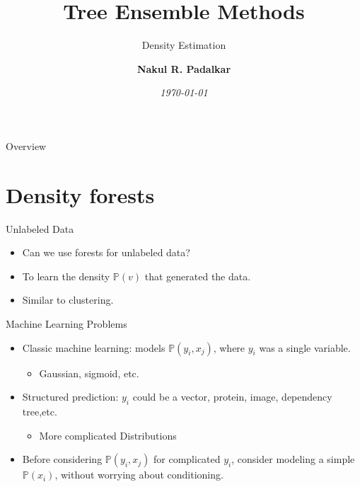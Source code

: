 \documentclass[11pt,aspectratio=1610,usenames,dvipsnames]{beamer} %
\title{Tree Ensemble Methods}
\subtitle{Density Estimation}
\author[Nakul R. Padalkar] %
{\bfseries Nakul R. Padalkar} %
\institute[Georgetown University] {\MakeUppercase{Georgetown University}}
\date{\it\today}
\begin{document}
\begin{frame}[plain]
\maketitle
\end{frame}

\begin{frame}{Overview}

\begin{multicols}{2}
	\tableofcontents[]
\end{multicols}

\end{frame}

\section{Density forests}%

\begin{frame}{Unlabeled Data}%
	\begin{itemize}
		\item Can we use forests for unlabeled data?
		\item To learn the density $ \mathbb{P}(v) $ that generated the data.
		\item Similar to clustering.
	\end{itemize}%
\end{frame}%
%
\begin{frame}{Machine Learning Problems}
	\begin{itemize}
		\item Classic machine learning: models $ \mathbb{P}(y_{i}, x_{j}) $, where $ y_{i} $ was a single variable.
		\begin{itemize}
			\item Gaussian, sigmoid, etc.
		\end{itemize}
		\item Structured prediction: $y_{i} $ could be a vector, protein, image, dependency tree,etc.
		\begin{itemize}
			\item More complicated Distributions
		\end{itemize}
		\item Before considering $ \mathbb{P}(y_{i}, x_{j}) $ for complicated $ y_{i} $, consider modeling a simple $ \mathbb{P}(x_{i}) $, without worrying about conditioning.
	\end{itemize}
\end{frame}
\end{document}
